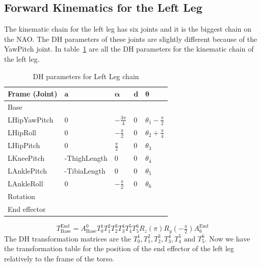 \subsection{Forward Kinematics for the Left Leg}
The kinematic chain for the left leg has six joints and it is the biggest chain on the NAO. The DH parameters of these joints are slightly different because of the YawPitch joint. In table~\ref{tab:DHlleg} are all the DH parameters for the kinematic chain of the left leg.
\begin{table}[!h]
\centering
\caption{DH parameters for Left Leg chain}
\begin{tabular}{|l|>{\centering\arraybackslash}m{2.55cm}|>{\centering\arraybackslash}m{2.55cm}|>{\centering\arraybackslash}m{2.55cm}|>{\centering\arraybackslash}m{2.55cm}|}
\hline
\textbf{Frame (Joint)} & $\mathbf{a}$ & $\boldsymbol{\alpha}$ & $\mathbf{d}$ & $\boldsymbol{\theta}$\\ \hline
Base & \multicolumn{4}{|c|}{$A(0,\text{\footnotesize{HipOffsetY}},\text{\footnotesize{-HipOffsetZ}})$} \\ \hline
LHipYawPitch & $0$ & $-\frac{3\pi}{4}$ & $0$ & $\theta_1 - \frac{\pi}{2}$ \\ \hline
LHipRoll & $0$ & $-\frac{\pi}{2}$ & $0$ & $\theta_2 + \frac{\pi}{4}$ \\ \hline
LHipPitch & $0$ & $\frac{\pi}{2}$ & $0$ & $\theta_3$ \\ \hline
LKneePitch & \footnotesize{-ThighLength} & $0$ & $0$ & $\theta_4$ \\ \hline
LAnklePitch & \footnotesize{-TibiaLength} & $0$ & $0$ & $\theta_5$ \\ \hline
LAnkleRoll & $0$ & $-\frac{\pi}{2}$ & $0$ & $\theta_6$ \\ \hline
Rotation & \multicolumn{4}{c|}{$R_z(\pi)R_y(-\tfrac{\pi}{2})$} \\ \hline
End effector & \multicolumn{4}{c|}{$A(0,0,\text{\footnotesize{-FootHeight}})$} \\ \hline
\end{tabular}
\label{tab:DHlleg}
\end{table}

\[
T^\text{End}_\text{Base} = A^0_\text{Base}T^1_0T^2_1T^3_2T^4_3T^5_4T^6_5R_z(\pi)R_y(-\tfrac{\pi}{2})A^\text{End}_{6}
\]
The DH transformation matrices are the $T^1_0,T^2_1,T^3_2,T^4_3,T^5_4\text{ and }T^6_5$. Now we have the transformation table for the position of the end effector of the left leg relatively to the frame of the torso.


